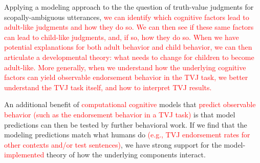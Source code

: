 \documentclass[preprint,authoryear]{elsarticle}\frenchspacing
\newcommand{\lp}[1]{\textcolor{red}{#1}} %
\begin{document}
Applying a modeling approach to the the question of truth-value judgments for scopally-ambiguous utterances, \lp{ we can identify which cognitive factors lead to adult-like judgments and how they do so. We can then see if these same factors can lead to child-like judgments, and, if so, how they do so. When we have potential explanations for both adult behavior and child behavior, we can then articulate a developmental theory: what needs to change for children to become adult-like.}
 \lp{More generally, when we understand how the underlying cognitive factors can yield observable endorsement behavior in the TVJ task, we better understand the TVJ task itself, and how to interpret TVJ results.}

 An additional benefit of \lp{computational cognitive} models that 
 \lp{predict observable behavior (such as the endorsement behavior in a TVJ task)}
 is that model predictions can then be tested by further behavioral work. If we find that the modeling predictions match what humans do
 \lp{(e.g., TVJ endorsement rates for other contexts and/or test sentences)}, we have strong support for the model-\lp{implemented} theory of how the underlying components interact. 
\end{document}
